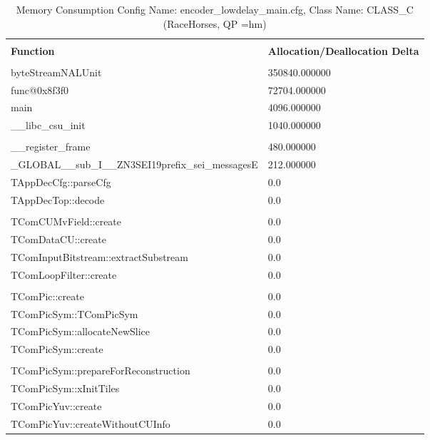 \documentclass{article}%
\begin{document}
\newpage%
\begin{longtabu}{| X[l] | X[l] |}%
\caption{%
Memory Consumption\newline%
 Config Name: encoder\_lowdelay\_main.cfg,\newline%
 Class Name: CLASS\_C\newline%
 (RaceHorses, QP =hm)%
}%
\hline%
&\\%
\textbf{Function}&\textbf{Allocation/Deallocation Delta}\\%
&\\%
\hline%
\endhead%
byteStreamNALUnit&350840.000000\\%
\hline%
func@0x8f3f0&72704.000000\\%
\hline%
main&4096.000000\\%
\hline%
\_\_libc\_csu\_init&1040.000000\\%
\hline%
&\\%
\hline%
\_\_register\_frame&480.000000\\%
\hline%
\_GLOBAL\_\_sub\_I\_\_ZN3SEI19prefix\_sei\_messagesE&212.000000\\%
\hline%
TAppDecCfg::parseCfg&0.0\\%
\hline%
TAppDecTop::decode&0.0\\%
\hline%
&\\%
\hline%
TComCUMvField::create&0.0\\%
\hline%
TComDataCU::create&0.0\\%
\hline%
TComInputBitstream::extractSubstream&0.0\\%
\hline%
TComLoopFilter::create&0.0\\%
\hline%
&\\%
\hline%
TComPic::create&0.0\\%
\hline%
TComPicSym::TComPicSym&0.0\\%
\hline%
TComPicSym::allocateNewSlice&0.0\\%
\hline%
TComPicSym::create&0.0\\%
\hline%
&\\%
\hline%
TComPicSym::prepareForReconstruction&0.0\\%
\hline%
TComPicSym::xInitTiles&0.0\\%
\hline%
TComPicYuv::create&0.0\\%
\hline%
TComPicYuv::createWithoutCUInfo&0.0\\%
\hline%
\end{longtabu}%
\newpage%
\end{document}
